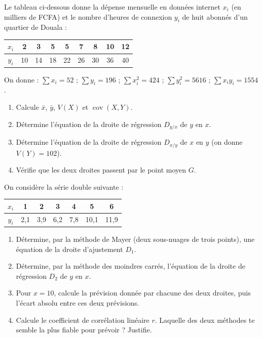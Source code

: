 \documentclass[11pt]{article}
\begin{document}
\begin{exercice}
Le tableau ci-dessous donne la dépense mensuelle en données internet $x_i$ (en milliers de FCFA) et le nombre d'heures de connexion $y_i$ de huit abonnés d'un quartier de Douala :

\begin{center}
\begin{tabular}{|c|cccccccc|}
\hline
\rowcolor{popblueL} $x_i$ & 2 & 3 & 5 & 5 & 7 & 8 & 10 & 12 \\
\hline
$y_i$ & 10 & 14 & 18 & 22 & 26 & 30 & 36 & 40 \\
\hline
\end{tabular}
\end{center}

On donne : $\displaystyle\sum x_i=52$ ; $\displaystyle\sum y_i=196$ ; $\displaystyle\sum x_i^2=424$ ; $\displaystyle\sum y_i^2=5616$ ; $\displaystyle\sum x_iy_i=1554$.

\begin{enumerate}
\item Calcule $\bar{x}$, $\bar{y}$, $V(X)$ et $\operatorname{cov}(X,Y)$.
\item Détermine l'équation de la droite de régression $D_{y/x}$ de $y$ en $x$.
\item Détermine l'équation de la droite de régression $D_{x/y}$ de $x$ en $y$ (on donne $V(Y)=102$).
\item Vérifie que les deux droites passent par le point moyen $G$.
\end{enumerate}
\end{exercice}

\begin{exercice}
On considère la série double suivante :

\begin{center}
\begin{tabular}{|c|cccccc|}
\hline
\rowcolor{popblueL} $x_i$ & 1 & 2 & 3 & 4 & 5 & 6 \\
\hline
$y_i$ & 2{,}1 & 3{,}9 & 6{,}2 & 7{,}8 & 10{,}1 & 11{,}9 \\
\hline
\end{tabular}
\end{center}

\begin{enumerate}
\item Détermine, par la méthode de Mayer (deux sous-nuages de trois points), une équation de la droite d'ajustement $D_1$.
\item Détermine, par la méthode des moindres carrés, l'équation de la droite de régression $D_2$ de $y$ en $x$.
\item Pour $x=10$, calcule la prévision donnée par chacune des deux droites, puis l'écart absolu entre ces deux prévisions.
\item Calcule le coefficient de corrélation linéaire $r$. Laquelle des deux méthodes te semble la plus fiable pour prévoir ? Justifie.
\end{enumerate}
\end{exercice}
\end{document}
